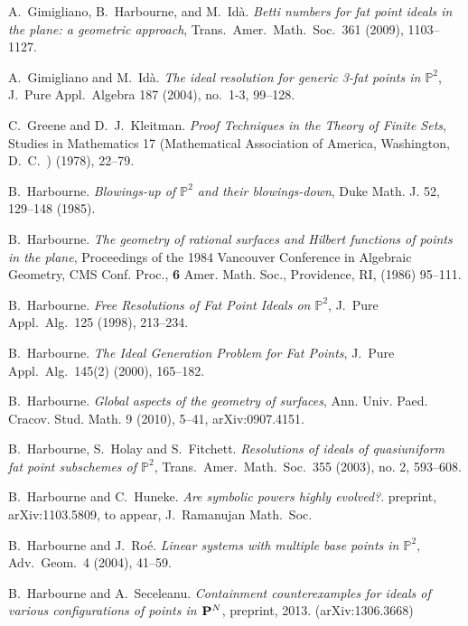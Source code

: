 \documentclass[11pt,twoside]{amsart}
\numberwithin{equation}{section}
\theoremstyle{definition}
\begin{document}
\begin{thebibliography}{B. et al}
 A.\ Gimigliano, B.\ Harbourne, and M.\ Id\`a. 
\emph{Betti numbers for fat point ideals in the plane: a geometric approach}, 
Trans.\ Amer.\ Math.\ Soc.\ 361 (2009), 1103--1127. 

 A.\ Gimigliano and M.\ Id\`a. 
\emph{The ideal resolution for generic 3-fat points in ${\mathbb{P}^{2}}$}, 
J.\ Pure Appl.\ Algebra 187 (2004), no.\ 1-3, 99--128. 

 C.\ Greene and D.\ J.\ Kleitman.
\emph{Proof Techniques in the Theory of Finite Sets},
Studies in Mathematics 17 (Mathematical Association of America, Washington, D.\ C.\ ) (1978), 22--79.

 B.\ Harbourne.
\emph{Blowings-up of ${\mathbb{P}^{2}}$ and their blowings-down}, 
Duke Math. J. 52, 129--148 (1985).

 B.\ Harbourne.
\emph{The geometry of rational surfaces and Hilbert functions of
points in the plane}, 
Proceedings of the 1984 Vancouver Conference in Algebraic Geometry, CMS Conf.
Proc., {\bf 6} Amer. Math. Soc., Providence, RI, (1986) 95--111.

 B.\ Harbourne.
\emph{Free Resolutions of Fat Point Ideals on ${\mathbb{P}^{2}}$}, 
J.\ Pure Appl.\ Alg.\ 125 (1998), 213--234. 

 B.\ Harbourne. 
\emph{The Ideal Generation Problem for Fat Points}, 
J.\ Pure Appl.\ Alg.\ 145(2) (2000), 165--182. 

 B.\ Harbourne.
\emph{Global aspects of the geometry of surfaces}, 
Ann. Univ. Paed. Cracov. Stud. Math. 9 (2010), 5--41, arXiv:0907.4151.

 B.\ Harbourne, S.\ Holay and S.\ Fitchett.
\emph{Resolutions of ideals of quasiuniform fat point subschemes of ${\mathbb{P}^{2}}$}, 
Trans.\ Amer.\ Math.\ Soc.\ 355 (2003), no. 2, 593--608. 

 B.\ Harbourne and C.\ Huneke. \emph{Are symbolic powers highly evolved?}.
preprint, arXiv:1103.5809, to appear, J.\ Ramanujan Math.\ Soc.

 B.\ Harbourne and J.\ Ro\'e. 
\emph{Linear systems with multiple base points in ${\mathbb{P}^{2}}$}, 
Adv.\ Geom.\ 4 (2004), 41--59. 

 B.\ Harbourne and A.\ Seceleanu. 
{\it Containment counterexamples for 
ideals of various configurations of points in ${\bf  P}^N$}, preprint, 2013. (arXiv:1306.3668)


\end{thebibliography}
\end{document}
